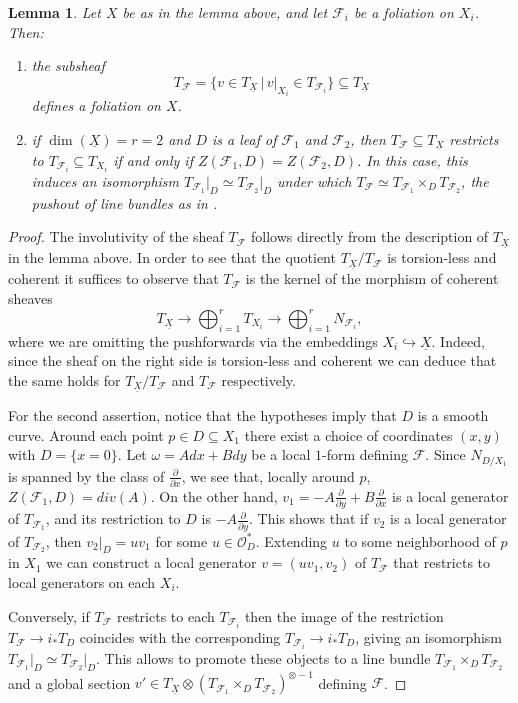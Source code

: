 \documentclass[reqno]{amsart}
\newcommand{\OO}{\mathcal{O}}
\newcommand{\F}{\mathscr{F}}
\newtheorem{lemma}[theorem]{Lemma}
\theoremstyle{definition}
\theoremstyle{named}
\begin{document}
\begin{lemma}\label{T_F_loc_free}
 Let $X$ be as in the lemma above, and let $\F_i$ be a foliation on $X_i$. Then:
    \begin{enumerate}
        \item the subsheaf $$ T_\F= \{v\in T_{\underline{X}}\,\vert\, v\vert_{X_i}\in T_{\F_i} \}\subseteq T_{\underline{X}}$$
        defines a foliation on $X$.
        \item if $\dim(\underline{X})=r=2$ and $D$ is a leaf of $\F_1$ and $\F_2$, then $T_\F \subseteq T_{\underline{X}}$ restricts to $T_{\F_i}\subseteq T_{X_i}$ if and only if  $Z(\F_1,D)=Z(\F_2,D)$. In this case, this  induces an isomorphism $T_{\F_1}\vert_D\simeq T_{\F_2}\vert_D$ under which $T_\F\simeq T_{\F_1}\times_D T_{\F_2} $, the pushout of line bundles as in \cite{ferrand2003conducteur}.
\end{enumerate}
\end{lemma}
\begin{proof} The involutivity of the sheaf $T_\F$ follows directly from the description of $T_{\underline{X}}$ in the lemma above. In order to see that the quotient $T_{\underline{X}}/T_\F$ is torsion-less and coherent it suffices to observe that $T_\F$ is the kernel of the morphism of coherent sheaves
$$ T_{\underline{X}}\to \bigoplus_{i=1}^r T_{X_i}\to \bigoplus_{i=1}^r N_{\F_i},$$
where we are omitting the pushforwards via the embeddings $X_i\hookrightarrow {\underline{X}}$. Indeed, since the sheaf on the right side is torsion-less and coherent we can deduce that the same holds for $T_{\underline{X}}/T_\F$ and $T_\F$ respectively. 

For the second assertion, notice that the hypotheses imply that $D$ is a smooth curve. Around each point $p\in D\subseteq X_1$ there exist a choice of coordinates $(x,y)$ with $D=\{x=0\}$. Let $\omega=Adx +Bdy$ be a local $1$-form defining $\F$. Since $N_{D/X_1}$ is spanned by the class of $\frac{\partial}{\partial x}$, we see that, locally around $p$, $Z(\F_1,D)=div(A)$. On the other hand, $v_1=-A\frac{\partial}{\partial y}+B\frac{\partial}{\partial x}$ is a local generator of $T_{\F_1}$, and its restriction to $D$ is $-A\frac{\partial}{\partial y}$. This shows that if $v_2$ is a local generator of $T_{\F_2}$, then $v_2\vert_D=u v_1$ for some $u\in \OO_D^*$. Extending $u$ to some neighborhood of $p$ in $X_1$ we can construct a local generator $v=(uv_1,v_2)$ of $T_\F$ that restricts to local generators on each $X_i$. 

Conversely, if $T_\F$ restricts to each $T_{\F_i}$ then the image of the restriction $T_\F\to i_*T_D$ coincides with the corresponding $T_{\F_i}\to i_*T_D$, giving an isomorphism $T_{\F_1}\vert_D\simeq T_{\F_2}\vert_D$. This allows to promote these objects to a line bundle $T_{\F_1}\times_D T_{\F_2}$ and a global section $v'\in T_{\underline{X}}\otimes (T_{\F_1}\times_D T_{\F_2})^{\otimes -1}$ defining $\F$.
\end{proof}
\end{document}
